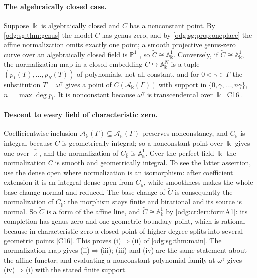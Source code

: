 \documentclass[11pt,oneside]{article}
\numberwithin{equation}{section}
\theoremstyle{definition}
\theoremstyle{remark}
\newcommand{\src}[1]{\textup{\textsf{\small[#1]}}}
\newcommand{\crA}{\mathcal A_\Bbbk(\Gamma)}
\newcommand{\Aff}{\mathbb A}
\begin{document}
\paragraph{The algebraically closed case.} Suppose $\Bbbk$ is algebraically closed and $C$
has a nonconstant point. By \cref{odg:sg:thm:genus} the model $\overline C$ has genus zero,
and by \cref{odg:sg:prop:oneplace} the affine normalization omits exactly one point; a
smooth projective genus-zero curve over an algebraically closed field is $\mathbb P^1$
\cite{StacksGenusZero}, so $\widetilde C\cong\Aff^1_\Bbbk$. Conversely, if
$\widetilde C\cong\Aff^1_\Bbbk$, the normalization map in a closed embedding
$C\hookrightarrow\Aff^N_\Bbbk$ is a tuple $(p_1(T),\ldots,p_N(T))$ of polynomials, not all
constant, and for $0<\gamma\in\Gamma$ the substitution $T=\omega^\gamma$ gives a point of
$C(\crA)$ with support in $\{0,\gamma,\ldots,n\gamma\}$, $n=\max\deg p_i$. It is
nonconstant because $\omega^\gamma$ is transcendental over $\Bbbk$ \src{C16}.

\paragraph{Descent to every field of characteristic zero.} Coefficientwise inclusion
$\crA\subseteq\mathcal A_{\bar\Bbbk}(\Gamma)$ preserves nonconstancy, and $C_{\bar\Bbbk}$ is
integral because $C$ is geometrically integral; so a nonconstant point over $\Bbbk$ gives
one over $\bar\Bbbk$, and the normalization of $C_{\bar\Bbbk}$ is $\Aff^1_{\bar\Bbbk}$. Over
the perfect field $\Bbbk$ the normalization $\widetilde C$ is smooth and geometrically
integral. To see the latter assertion, use the dense open where normalization
is an isomorphism: after coefficient extension it is an integral dense open
from $C_{\bar\Bbbk}$, while smoothness makes the whole base change normal
and reduced. The base change of $\widetilde C$ is consequently the
normalization of $C_{\bar\Bbbk}$: the morphism stays finite and birational
and its source is normal. So $\widetilde C$ is a form of the
affine line, and $\widetilde C\cong\Aff^1_\Bbbk$ by \cref{odg:cr:lem:formA1}: its completion
has genus zero and one geometric boundary point, which is rational because in
characteristic zero a closed point of higher degree splits into several geometric points
\src{C16}. This proves (i)$\Rightarrow$(ii) of \cref{odg:sg:thm:main}. The normalization map
gives (ii)$\Rightarrow$(iii); (iii) and (iv) are the same statement about the affine
functor; and evaluating a nonconstant polynomial family at $\omega^\gamma$ gives
(iv)$\Rightarrow$(i) with the stated finite support.
\end{document}
